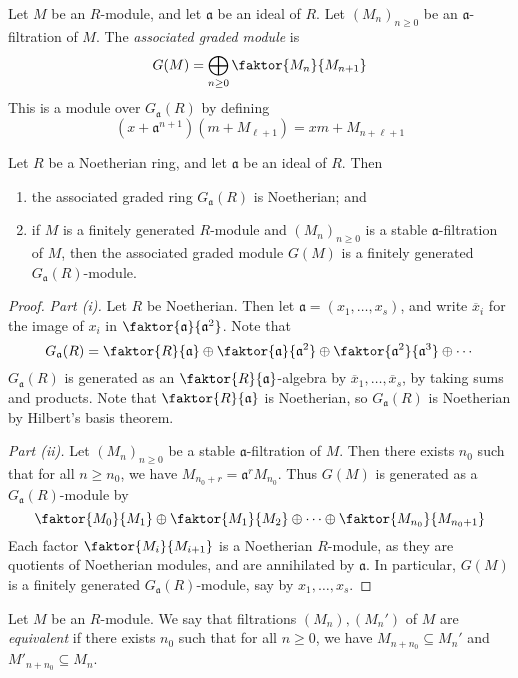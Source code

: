 \begin{definition}
    Let \( M \) be an \( R \)-module, and let \( \mathfrak a \) be an ideal of \( R \).
    Let \( (M_n)_{n \geq 0} \) be an \( \mathfrak a \)-filtration of \( M \).
    The \emph{associated graded module} is
    \[ G(M) = \bigoplus_{n \geq 0} \faktor{M_n}{M_{n+1}} \]
    This is a module over \( G_{\mathfrak a}(R) \) by defining
    \[ (x + \mathfrak a^{n+1})(m + M_{\ell + 1}) = xm + M_{n+\ell+1} \]
\end{definition}
\begin{proposition}
    Let \( R \) be a Noetherian ring, and let \( \mathfrak a \) be an ideal of \( R \).
    Then
    \begin{enumerate}
        \item the associated graded ring \( G_{\mathfrak a}(R) \) is Noetherian; and
        \item if \( M \) is a finitely generated \( R \)-module and \( (M_n)_{n \geq 0} \) is a stable \( \mathfrak a \)-filtration of \( M \), then the associated graded module \( G(M) \) is a finitely generated \( G_{\mathfrak a}(R) \)-module.
    \end{enumerate}
\end{proposition}
\begin{proof}
    \emph{Part (i).}
    Let \( R \) be Noetherian.
    Then let \( \mathfrak a = (x_1, \dots, x_s) \), and write \( \overline x_i \) for the image of \( x_i \) in \( \faktor{\mathfrak a}{\mathfrak a^2} \).
    Note that
    \[ G_{\mathfrak a}(R) = \faktor{R}{\mathfrak a} \oplus \faktor{\mathfrak a}{\mathfrak a^2} \oplus \faktor{\mathfrak a^2}{\mathfrak a^3} \oplus \cdots \]
    \( G_{\mathfrak a}(R) \) is generated as an \( \faktor{R}{\mathfrak a} \)-algebra by \( \overline x_1, \dots, \overline x_s \), by taking sums and products.
    Note that \( \faktor{R}{\mathfrak a} \) is Noetherian, so \( G_{\mathfrak a}(R) \) is Noetherian by Hilbert's basis theorem.

    \emph{Part (ii).}
    Let \( (M_n)_{n \geq 0} \) be a stable \( \mathfrak a \)-filtration of \( M \).
    Then there exists \( n_0 \) such that for all \( n \geq n_0 \), we have \( M_{n_0 + r} = \mathfrak a^r M_{n_0} \).
    Thus \( G(M) \) is generated as a \( G_{\mathfrak a}(R) \)-module by
    \[ \faktor{M_0}{M_1} \oplus \faktor{M_1}{M_2} \oplus \dots \oplus \faktor{M_{n_0}}{M_{n_0 + 1}} \]
    Each factor \( \faktor{M_i}{M_{i+1}} \) is a Noetherian \( R \)-module, as they are quotients of Noetherian modules, and are annihilated by \( \mathfrak a \).
    In particular, \( G(M) \) is a finitely generated \( G_{\mathfrak a}(R) \)-module, say by \( x_1, \dots, x_s \).
\end{proof}
\begin{definition}
    Let \( M \) be an \( R \)-module.
    We say that filtrations \( (M_n), (M_n') \) of \( M \) are \emph{equivalent} if there exists \( n_0 \) such that for all \( n \geq 0 \), we have \( M_{n + n_0} \subseteq M_n' \) and \( M'_{n + n_0} \subseteq M_n \).
\end{definition}
